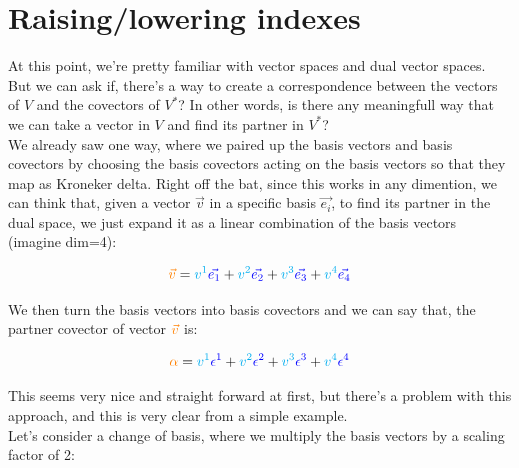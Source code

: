 \section{Raising/lowering indexes}

At this point, we're pretty familiar with vector spaces and dual vector spaces.\\
But we can ask if, there's a way to create a correspondence between the vectors of $\textit{V}$ and the covectors of $V^*$?
In other words, is there any meaningfull way that we can take a vector in $\textit{V}$ and find its partner in $V^*$?\\

We already saw one way, where we paired up the basis vectors and basis covectors by choosing the basis covectors acting on the basis vectors
so that they map as Kroneker delta.
Right off the bat, since this works in any dimention, we can think that, given a vector $\vec{v}$ in a specific basis $\vec{e_i}$, to find its 
partner in the dual space, we just expand it as a linear combination of the basis vectors (imagine dim=4):

\begin{equation}
    \begingroup\color{orange}\vec{v}\endgroup = \begingroup\color{cyan}v^1\endgroup \begingroup\color{blue}\vec{e_1}\endgroup + 
    \begingroup\color{cyan}v^2\endgroup \begingroup\color{blue}\vec{e_2}\endgroup + \begingroup\color{cyan}v^3\endgroup \begingroup\color{blue}\vec{e_3}\endgroup +
    \begingroup\color{cyan}v^4\endgroup \begingroup\color{blue}\vec{e_4}\endgroup
\end{equation}

We then turn the basis vectors into basis covectors and we can say that, the partner covector of vector $\begingroup\color{orange}\vec{v}\endgroup$ is:

\begin{equation}
    \begingroup\color{orange}\alpha\endgroup = \begingroup\color{cyan}v^1\endgroup \begingroup\color{blue}\epsilon^1\endgroup + 
    \begingroup\color{cyan}v^2\endgroup \begingroup\color{blue}\epsilon^2\endgroup + \begingroup\color{cyan}v^3\endgroup \begingroup\color{blue}\epsilon^3\endgroup +
    \begingroup\color{cyan}v^4\endgroup \begingroup\color{blue}\epsilon^4\endgroup
\end{equation}

This seems very nice and straight forward at first, but there's a problem with this approach, and this is very clear
from a simple example.\\
Let's consider a change of basis, where we multiply the basis vectors by a scaling factor of 2:

